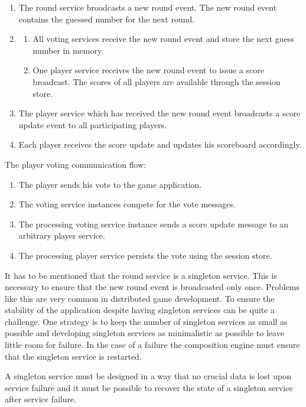 \begin{enumerate}[label=\Alph*.]
  \item The round service broadcasts a new round event. The new round event
  contains the guessed number for the next round.
  \item \begin{enumerate}[label=\arabic*.]
    \item All voting services receive the new round event and store the next
    guess number in memory.
  	\item One player service receives the new round event to issue a score
  	broadcast. The scores of all players are available through the session store.
  \end{enumerate}
  \item The player service which has received the new round event broadcasts a
  score update event to all participating players.
  \item Each player receives the score update and updates his scoreboard
  accordingly.
   
\end{enumerate}

\noindent
The player voting communication flow:

\begin{enumerate}
  \item The player sends his vote to the game application.
  \item The voting service instances compete for the vote messages.
  \item The processing voting service instance sends a score update message to
  an arbitrary player service.
  \item The processing player service persists the vote using the session store.
\end{enumerate}

It has to be mentioned that the round service is a singleton service. This is
necessary to ensure that the new round event is broadcasted only once. Problems
like this are very common in distributed game development. To ensure the
stability of the application despite having singleton services can be quite a
challenge. One strategy is to keep the number of singleton services as small as
possible and developing singleton services as minimalistic as possible to leave
little room for failure. In the case of a failure the composition engine must
ensure that the singleton service is restarted.

A singleton service must be designed in a way that no crucial data is lost upon
service failure and it must be possible to recover the state of a singleton
service after service failure.



